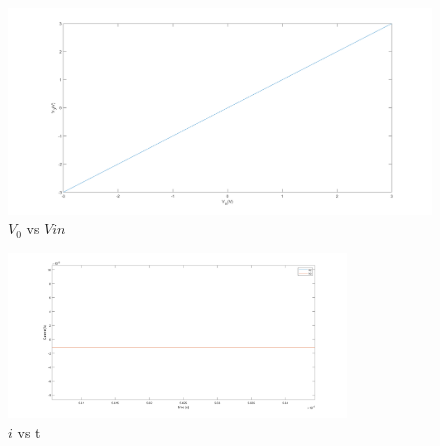 \documentclass[letterpaper,12pt]{article}
\begin{document}
\begin{figure}[H]
	\centering
   \includegraphics[width=1\textwidth]{3b_vs_vin.png}
   \caption{\(V_0\) vs \(V{in}\)}
\end{figure}

\begin{figure}[H]
	\centering
   \includegraphics[width=0.8\textwidth]{3b_i.png}
   \caption{\(i\) vs t}
\end{figure}
\end{document}
